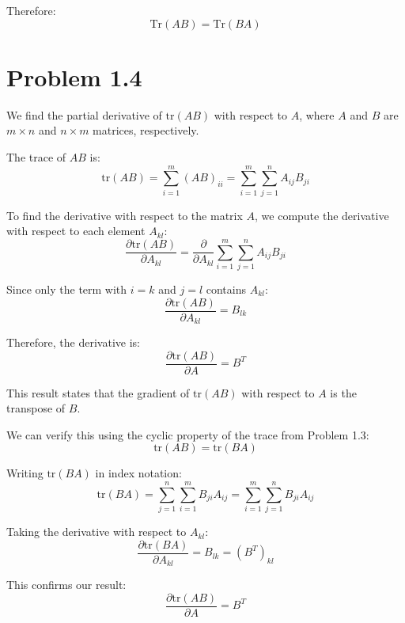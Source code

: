 Therefore:
\begin{equation}
\text{Tr}(AB) = \text{Tr}(BA)
\end{equation}

\section*{Problem 1.4}

We find the partial derivative of $\text{tr}(AB)$ with respect to $A$, where $A$ and $B$ are $m \times n$ and $n \times m$ matrices, respectively.

The trace of $AB$ is:
\begin{equation}
\text{tr}(AB) = \sum_{i=1}^{m} (AB)_{ii} = \sum_{i=1}^{m} \sum_{j=1}^{n} A_{ij} B_{ji}
\end{equation}

To find the derivative with respect to the matrix $A$, we compute the derivative with respect to each element $A_{kl}$:
\begin{equation}
\frac{\partial \text{tr}(AB)}{\partial A_{kl}} = \frac{\partial}{\partial A_{kl}} \sum_{i=1}^{m} \sum_{j=1}^{n} A_{ij} B_{ji}
\end{equation}

Since only the term with $i=k$ and $j=l$ contains $A_{kl}$:
\begin{equation}
\frac{\partial \text{tr}(AB)}{\partial A_{kl}} = B_{lk}
\end{equation}

Therefore, the derivative is:
\begin{equation}
\frac{\partial \text{tr}(AB)}{\partial A} = B^T
\end{equation}

This result states that the gradient of $\text{tr}(AB)$ with respect to $A$ is the transpose of $B$.

We can verify this using the cyclic property of the trace from Problem 1.3:
\begin{equation}
\text{tr}(AB) = \text{tr}(BA)
\end{equation}

Writing $\text{tr}(BA)$ in index notation:
\begin{equation}
\text{tr}(BA) = \sum_{j=1}^{n} \sum_{i=1}^{m} B_{ji} A_{ij} = \sum_{i=1}^{m} \sum_{j=1}^{n} B_{ji} A_{ij}
\end{equation}

Taking the derivative with respect to $A_{kl}$:
\begin{equation}
\frac{\partial \text{tr}(BA)}{\partial A_{kl}} = B_{lk} = (B^T)_{kl}
\end{equation}

This confirms our result:
\begin{equation}
\frac{\partial \text{tr}(AB)}{\partial A} = B^T
\end{equation}
